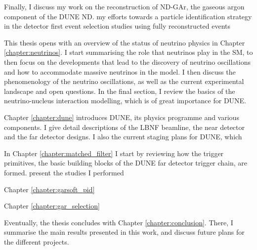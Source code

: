 Finally, I discuss my work on the reconstruction of ND-GAr, the gaseous argon component of the DUNE ND. my efforts towards a particle identification strategy in the detector first event selection studies using fully reconstructed events

This thesis opens with an overview of the status of neutrino physics in Chapter \ref{chapter:neutrinos}. I start summarising the role that neutrinos play in the SM, to then focus on the developments that lead to the discovery of neutrino oscillations and how to accommodate massive neutrinos in the model. I then discuss the phenomenology of the neutrino oscillations, as well as the current experimental landscape and open questions. In the final section, I review the basics of the neutrino-nucleus interaction modelling, which is of great importance for DUNE.

Chapter \ref{chapter:dune} introduces DUNE, its physics programme and various components. I give detail descriptions of the LBNF beamline, the near detector and the far detector designs. I also the current staging plans for DUNE, which 

In Chapter \ref{chapter:matched_filter} I start by reviewing how the trigger primitives, the basic building blocks of the DUNE far detector trigger chain, are formed. present the studies I performed 

Chapter \ref{chapter:garsoft_pid}

Chapter \ref{chapter:gar_selection}

Eventually, the thesis concludes with Chapter \ref{chapter:conclusion}. There, I summarise the main results presented in this work, and discuss future plans for the different projects.
